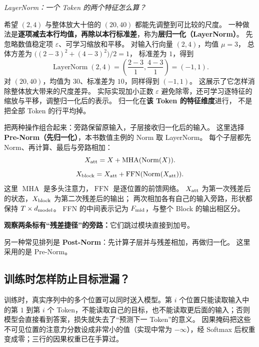 \begin{example}[breakable=false]
\noindent\emph{LayerNorm：一个 Token 的两个特征怎么算？}\par

希望 $(2,4)$ 与整体放大十倍的 $(20,40)$ 都能先调整到可比较的尺度。
一种做法是\textbf{逐项减去本行均值，再除以本行标准差}，称为\textbf{层归一化（LayerNorm）}。
先忽略数值稳定项 $\varepsilon$、可学习缩放和平移。
对输入行向量 $(2,4)$，均值 $\mu=3$，
总体方差为 $\bigl((2-3)^2+(4-3)^2\bigr)/2=1$，
标准差为 $1$，得到
\[
\operatorname{LayerNorm}(2,4)
=\left(\frac{2-3}{1},\frac{4-3}{1}\right)=\boxed{(-1,1)}.
\]
对 $(20,40)$，均值为 $30$、标准差为 $10$，同样得到 $(-1,1)$。
这展示了它怎样消除整体放大带来的尺度差异。
实际实现加小正数 $\varepsilon$ 避免除零，还可学习逐特征的缩放与平移，调整归一化后的表示。
归一化在\textbf{该 Token 的特征维度}进行，
不是把全部 Token 的行平均掉。
\end{example}

把两种操作组合起来：旁路保留原输入，子层接收归一化后的输入。
\label{concept:pre-norm}%
这里选择\textbf{Pre-Norm（先归一化）}，本书数值主例的 Norm 取 LayerNorm。
每个子层都先 Norm、再计算、最后与旁路相加：
\begin{equation}
\label{eq:pre-norm-att}
X_{\rm att}=X+\operatorname{MHA}(\operatorname{Norm}(X)).
\end{equation}
\begin{equation}
\label{eq:pre-norm-ffn}
X_{\rm block}=X_{\rm att}+\operatorname{FFN}(\operatorname{Norm}(X_{\rm att})).
\end{equation}
这里 $\operatorname{MHA}$ 是多头注意力，$\operatorname{FFN}$ 是逐位置的前馈网络。
$X_{\rm att}$ 为第一次残差后的状态，$X_{\rm block}$ 为第二次残差后的输出；
两次相加各有自己的输入旁路，形状都保持 $T\times d_{\rm model}$。
FFN 的中间表示记为 $F_{\rm mid}$，与整个 Block 的输出相区分。

\textbf{观察两条标有“残差捷径”的旁路：}它们跳过模块直接到加号。


另一种常见排列是 \textbf{Post-Norm}：先计算子层并与残差相加，再做归一化。
这里采用的是 Pre-Norm。

\subsection{训练时怎样防止目标泄漏？}

训练时，真实序列中的多个位置可以同时送入模型。第 $i$ 个位置只能读取输入中的第 $1$ 到第 $i$ 个 Token，不能读取自己的目标，也不能读取更后面的输入；否则模型会直接看到答案，损失就失去了“预测下一 Token”的意义。
因果掩码把这些不可见位置的注意力分数设成非常小的值（实现中常为 $-\infty$），经 Softmax 后权重变成零；三行的因果权重已在手算过。

